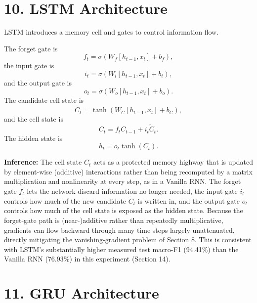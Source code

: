 \documentclass[10pt]{article}
\begin{document}
\section*{10. LSTM Architecture}

LSTM introduces a memory cell and gates to control information flow.

The forget gate is
\[
f_t=\sigma(W_f[h_{t-1},x_t]+b_f),
\]
the input gate is
\[
i_t=\sigma(W_i[h_{t-1},x_t]+b_i),
\]
and the output gate is
\[
o_t=\sigma(W_o[h_{t-1},x_t]+b_o).
\]
The candidate cell state is
\[
\tilde{C}_t=
\tanh(W_C[h_{t-1},x_t]+b_C),
\]
and the cell state is
\[
C_t=f_tC_{t-1}+i_t\tilde{C}_t.
\]
The hidden state is
\[
h_t=o_t\tanh(C_t).
\]

\begin{center}
\end{center}

\textbf{Inference:} The cell state $C_t$ acts as a protected memory highway
that is updated by element-wise (additive) interactions rather than being
recomputed by a matrix multiplication and nonlinearity at every step, as in
a Vanilla RNN. The forget gate $f_t$ lets the network discard information no
longer needed, the input gate $i_t$ controls how much of the new candidate
$\tilde{C}_t$ is written in, and the output gate $o_t$ controls how much of
the cell state is exposed as the hidden state. Because the forget-gate path
is (near-)additive rather than repeatedly multiplicative, gradients can flow
backward through many time steps largely unattenuated, directly mitigating
the vanishing-gradient problem of Section 8. This is consistent with LSTM's
substantially higher measured test macro-F1 (94.41\%) than the Vanilla RNN
(76.93\%) in this experiment (Section 14).

\section*{11. GRU Architecture}
\end{document}
